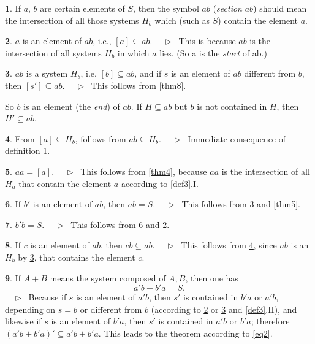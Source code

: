 \documentclass[leqno,hidelinks]{article}
\theoremstyle{definition}
\newtheorem{satz}{\protect\satzname}
\newtheorem{deff}[satz]{\protect\deffname}
\newcommand{\satzname}{}
\newcommand{\deffname}{}
\renewcommand{\satzname}{\hspace{-4pt}.\ Satz}%
\renewcommand{\deffname}{\hspace{-4pt}.\ Definition}%
\renewcommand{\satzname}{\hspace{-4pt}.\ Theorem}%
\renewcommand{\deffname}{\hspace{-4pt}.\ Definition}%
\newcommand\Beweis{\medskip \newline $ \phantom{'.'} \rhd \ $}%
\newcommand\beweis{ $ \phantom{'.'} \rhd \ $}%
\newcommand{\partof}{\subseteq}
\newcommand{\sref}[1]{\underline{\ref{#1}}}%
\begin{document}
\begin{paracol}{2}
\begin{deff}\label{def9}
If $a$, $b$ are certain elements of $S$, then the symbol $ab$ (\emph{section} $ab$)
should mean the intersection of all those systems $H_b$ which (such as $S$)
contain the element $a$.%
\end{deff}

\newpage
\begin{satz}\label{thm10}
$a$ is an element of $ab$, i.e., $[a] \partof ab$.
\Beweis
This is because $ab$ is the intersection of all systems $H_b$ in which $a$ lies.
(So a is the \emph{start} of ab.)
\end{satz}

\begin{satz}\label{thm11}
$ab$ is a system $H_b$, i.e. $[b] \partof ab$, and if $s$ is an element of $ab$
different from $b$, then $[s'] \partof ab$.
\Beweis
This follows from \sref{thm8}.
\end{satz}

So $b$ is an element (the \emph{end}) of $ab$. If $H \partof ab$ but $b$ is not
contained in $H$, then $H' \partof ab$.

\begin{satz}\label{thm12}
From $[a] \partof H_b$, follows from $ab \partof H_b$.
\Beweis
Immediate consequence of definition \sref{def9}.
\end{satz}

\begin{satz}\label{thm13}
$aa = [a]$.
\Beweis
This follows from \sref{thm4}, because $aa$ is the intersection of all $H_a$
that contain the element $a$ according to \sref{def3}.I.
\end{satz}

\begin{satz}\label{thm14}
If $b'$ is an element of $ab$, then $ab = S$.
\Beweis
This follows from \sref{thm11} and \sref{thm5}.
\end{satz}

\begin{satz}\label{thm15}
$b' b = S$.
\Beweis
This follows from \sref{thm14} and \sref{thm10}.
\end{satz}

\begin{satz}\label{thm16}
If $c$ is an element of $ab$, then $cb \partof ab$.
\Beweis
This follows from \sref{thm12}, since $ab$ is an $H_b$ by \sref{thm11}, that
contains the element $c$.
\end{satz}

\begin{satz}\label{thm17}
If $A + B$ means the system composed of $A, B$, then one has
\[
	a'b + b'a = S.
\]%
\beweis
Because if $s$ is an element of $a'b$, then $s'$ is contained in $b'a$ or $a'b$,
depending on $s = b$ or different from $b$ (according to \sref{thm10} or
\sref{thm11} and \sref{def3}.II), and likewise if $s$ is an element of $b'a$,
then $s'$ is contained in $a'b$ or $b'a$; therefore $(a'b + b'a)' \partof a'b + b'a$.
This leads to the theorem according to \eqref{eq2}.
\end{satz}


\end{paracol}
\end{document}
